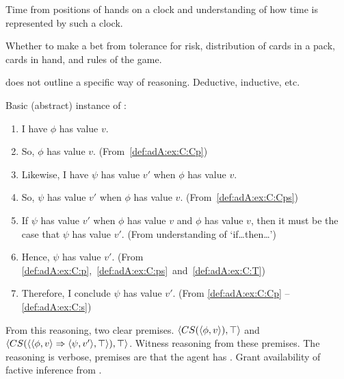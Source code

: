 \begin{note}[\illu{1}]
  Time from positions of hands on a clock and understanding of how time is represented by such a clock.

  Whether to make a bet from tolerance for risk, distribution of cards in a pack, cards in hand, and rules of the game.
\end{note}

\begin{note}
  \adA{} does not outline a specific way of reasoning.
  Deductive, inductive, etc.\
\end{note}

\begin{note}
  Basic (abstract) instance of \adA{}:

  {
    \small
    \begin{enumerate}[label=\arabic*., ref=\arabic*]
    \item\label{def:adA:ex:C:Cp} I have  \(\phi\) has value \(v\).
    \item\label{def:adA:ex:C:p} So, \(\phi\) has value \(v\). \hfill(From~\ref{def:adA:ex:C:Cp})
    \item\label{def:adA:ex:C:Cps} Likewise, I have \csVed{0} \(\psi\) has value \(v'\) when \(\phi\) has value \(v\).
    \item\label{def:adA:ex:C:ps} So, \(\psi\) has value \(v'\) when \(\phi\) has value \(v\). \hfill(From~\ref{def:adA:ex:C:Cps})
    \item\label{def:adA:ex:C:T} If \(\psi\) has value \(v'\) when \(\phi\) has value \(v\) and \(\phi\) has value \(v\), then it must be the case that \(\psi\) has value \(v'\). \hfill (From understanding of `if\dots then\dots')
    \item\label{def:adA:ex:C:s} Hence, \(\psi\) has value \(v'\).\newline
      \mbox{}\hfill (From \ref{def:adA:ex:C:p},~\ref{def:adA:ex:C:ps}~and~\ref{def:adA:ex:C:T})
    \item Therefore, I conclude \(\psi\) has value \(v'\). \hfill (From \ref{def:adA:ex:C:Cp} -- \ref{def:adA:ex:C:s})
    \end{enumerate}
  }
  From this reasoning, two clear premises.
  \(\langle CS(\langle \phi, v \rangle), \top \rangle\) and \(\langle CS(\langle \langle \phi, v \rangle \Rightarrow \langle \psi, v' \rangle, \top \rangle), \top \rangle\).
  Witness reasoning from these premises.
  The reasoning is verbose, premises are that the agent has .
  Grant availability of factive inference from \csVed{0}.


\end{note}
